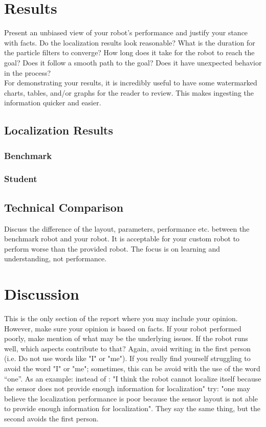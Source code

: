 \documentclass[10pt,journal,compsoc]{IEEEtran}
\begin{document}
\section{Results}
Present an unbiased view of your robot's performance and justify your stance with facts. Do the localization results look reasonable? What is the duration for the particle filters to converge? How long does it take for the robot to reach the goal? Does it follow a smooth path to the goal? Does it have unexpected behavior in the process? \\
For demonstrating your results, it is incredibly useful to have some watermarked charts, tables, and/or graphs for the reader to review. This makes ingesting the information quicker and easier.

\subsection{Localization Results}
\subsubsection{Benchmark}
\subsubsection{Student}

\subsection{Technical Comparison} %
Discuss the difference of the layout, parameters, performance etc. between the benchmark robot and your robot. It is acceptable for your custom robot to perform worse than the provided robot. The focus is on learning and understanding, not performance. 

\section{Discussion}
This is the only section of the report where you may include your opinion. However, make sure your opinion is based on facts. If your robot performed poorly, make mention of what may be the underlying issues. If the robot runs well, which aspects contribute to that? Again, avoid writing in the first person (i.e. Do not use words like "I" or "me"). If you really find yourself struggling to avoid the word "I" or "me"; sometimes, this can be avoid with the use of the word “one”. As an example: instead of : "I think the robot cannot localize itself because the sensor does not provide enough information for localization" try: "one may believe the localization performance is poor because the sensor layout is not able to provide enough information for localization". They say the same thing, but the second avoids the first person. 
\end{document}
